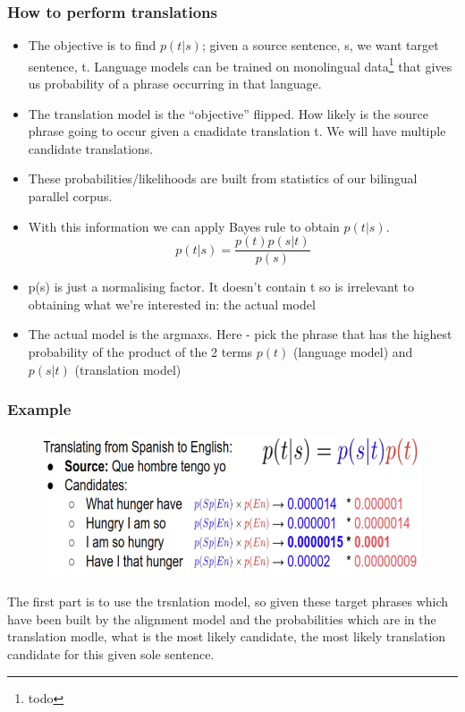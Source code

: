 \documentclass[11pt]{article}
\begin{document}
\subsubsection{How to perform translations}

\begin{itemize}
    \item The objective is to find $p(t|s)$; given a source sentence, s, we want target sentence, t. Language models can be trained on monolingual data\footnote{todo} that gives us probability of a phrase occurring in that language.
    \item The translation model is the ``objective'' flipped. How likely is the source phrase going to occur given a cnadidate translation t. We will have multiple candidate translations. 
    \item These probabilities/likelihoods are built from statistics of our bilingual parallel corpus.
    \item With this information we can apply Bayes rule to obtain $p(t|s)$.
    \begin{equation*}
        p(t|s) = \frac{p(t)p(s|t)}{p(s)}
    \end{equation*}
    \item p(s) is just a normalising factor. It doesn't contain t so is irrelevant to     obtaining what we're interested in: the actual model
    \item The actual model is the argmaxs. Here - pick the phrase that has the highest
    probability of the product of the 2 terms $p(t)$ (language model) and $p(s|t)$
    (translation model)
\end{itemize}

\subsubsection{Example}

\begin{figure}[H]
    \centering
    \includegraphics*[width=.6\linewidth]{figures/example-translation-1.png}
\end{figure}

The first part is to use the trsnlation model, so given these target phrases which have been built by the alignment model and the probabilities which are in the translation modle, what is the most likely candidate, the most likely translation candidate for this given sole sentence. 
\end{document}
